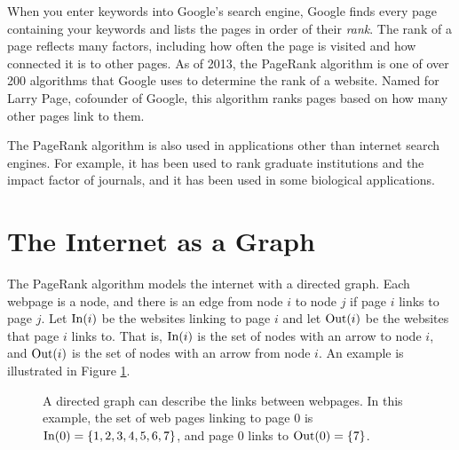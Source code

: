 \label{lab:PageRank}

When you enter keywords into Google's search engine, Google finds every page containing your keywords and lists the pages in order of their \emph{rank}.
The rank of a page reflects many factors, including how often the page is visited and how connected it is to other pages.
As of 2013, the PageRank algorithm is one of over 200 algorithms that Google uses to determine the rank of a website.
Named for Larry Page, cofounder of Google, this algorithm ranks pages based on how many other pages link to them.

The PageRank algorithm is also used in applications other than internet search engines.
For example, it has been used to rank graduate institutions and the impact factor of journals, and it has been used in some biological applications.

\section*{The Internet as a Graph}
The PageRank algorithm models the internet with a directed graph. 
Each webpage is a node, and there is an edge from node $i$ to node $j$ if page $i$ links to page $j$.
Let $\operatorname{In}(i)$ be the websites linking to page $i$ and let $\operatorname{Out}(i)$ be the websites that page $i$ links to. 
That is, $\operatorname{In}(i)$ is the set of nodes with an arrow to node $i$, and $\operatorname{Out}(i)$ is the set of nodes with an arrow from node $i$.
An example is illustrated in Figure \ref{fig:network1}.

\begin{figure}
\centering
{}

\caption{A directed graph can describe the links between webpages. In this example, the set of web pages linking to page 0 is $\operatorname{In}(0)=\{1,2,3,4,5,6,7\}$, and page 0 links to $\operatorname{Out}(0)=\{7\}$.}
\label{fig:network1}
\end{figure}

